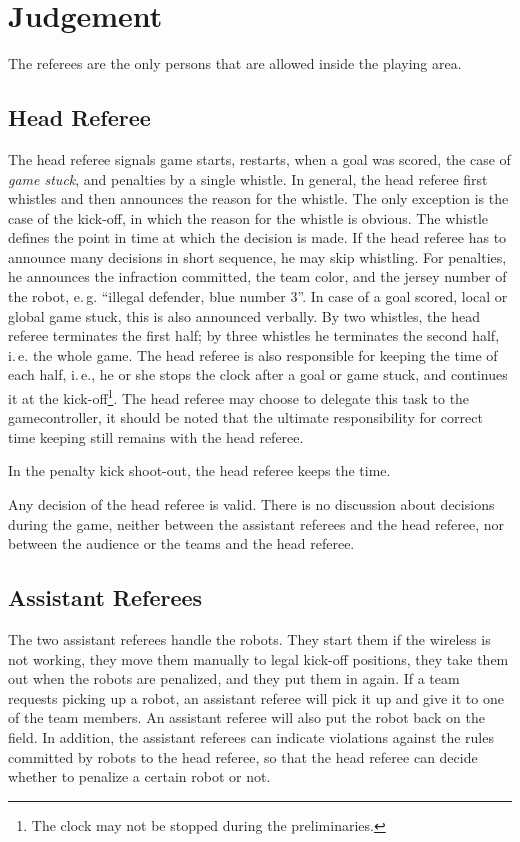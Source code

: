 \documentclass[12pt]{article}
\newcommand{\ie}{\mbox{i.\,e.}\xspace}
\newcommand{\eg}{\mbox{e.\,g.}\xspace}
\begin{document}
\section{Judgement}

The referees are the only persons that are allowed inside the
playing area.

\subsection{Head Referee}

The head referee signals game starts, restarts, when a goal was
scored, the case of \emph{game stuck}, and penalties by a single
whistle. In general, the head referee first whistles and then
announces the reason for the whistle. The only exception is the case
of the kick-off, in which the reason for the whistle is obvious. The
whistle defines the point in time at which the decision is made. If
the head referee has to announce many decisions in short sequence,
he may skip whistling. For penalties, he announces the infraction
committed, the team color, and the jersey number of the robot, \eg
``illegal defender, blue number 3''. In case of a goal scored, local
or global game stuck, this is also announced verbally. By two
whistles, the head referee terminates the first half; by three
whistles he terminates the second half, \ie the whole game. The head
referee is also responsible for keeping the time of each half, \ie,
he or she stops the clock after a goal or game stuck, and continues
it at the kick-off\footnote{The clock may not be stopped during the
preliminaries.}. The head referee may choose to delegate this task
to the gamecontroller, it should be noted that the ultimate
responsibility for correct time keeping still remains with the head
referee.

In the penalty kick shoot-out, the head referee keeps the time.

Any decision of the head referee is valid. There is no discussion
about decisions during the game, neither between the assistant
referees and the head referee, nor between the audience or the teams
and the head referee.

\subsection{Assistant Referees}

The two assistant referees handle the robots. They start them if the
wireless is not working, they move them manually to legal kick-off
positions, they take them out when the robots are penalized, and
they put them in again. If a team requests picking up a robot, an
assistant referee will pick it up and give it to one of the team
members. An assistant referee will also put the robot back on the
field. In addition, the assistant referees can indicate violations
against the rules committed by robots to the head referee, so that
the head referee can decide whether to penalize a certain robot or
not.
\end{document}
